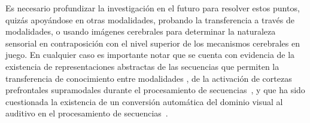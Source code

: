 Es necesario profundizar la investigación en el futuro para resolver estos puntos, quizás apoyándose en otras modalidades, probando la transferencia a través de modalidades, o usando imágenes cerebrales para determinar la naturaleza sensorial en contraposición con el nivel superior de los mecanismos cerebrales en juego. En cualquier caso es importante notar que se cuenta con evidencia de la existencia de representaciones abstractas de las secuencias que permiten la transferencia de conocimiento entre modalidades \cite{yildirim2015learning}, de la activación de cortezas prefrontales supramodales durante el procesamiento de secuencias~\cite{f19,f60}, y que ha sido cuestionada la existencia de un conversión automática del dominio visual al auditivo en el procesamiento de secuencias~\cite{f121}.



